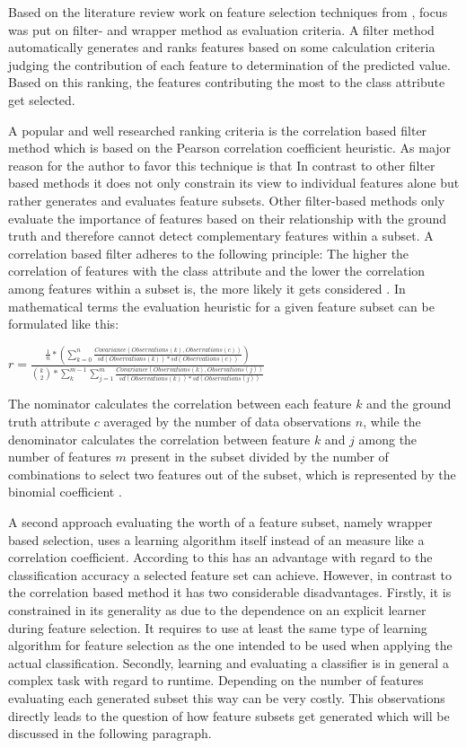 Based on the literature review work on feature selection techniques from \cite{chandrashekar2014survey}, focus was put on filter- and wrapper method as evaluation criteria. A filter method automatically generates and ranks features based on some calculation criteria judging the contribution of each feature to determination of the predicted value. Based on this ranking, the features contributing the most to the class attribute get selected.

A popular and well researched ranking criteria is the correlation based filter method which is based on the Pearson correlation coefficient heuristic. As major reason for the author to favor this technique is that In contrast to other filter based methods it does not only constrain its view to individual features alone but rather generates and evaluates feature subsets. Other filter-based methods only evaluate the importance of features based on their relationship with the ground truth and therefore cannot detect complementary features within a subset. A correlation based filter adheres to the following principle: The higher the correlation of features with the class attribute and the lower the correlation among features within a subset is, the more likely it gets considered \cite{hall2000correlation}. In mathematical terms the evaluation heuristic for a given feature subset can be formulated like this:

$r = \frac{\frac{1}{n} * (\displaystyle\sum_{k=0}^{n} \frac{Covariance(Observations(k), Observations(c))}{sd(Observations(k)) * sd(Observations(c))})}{\binom{k}{2} * \displaystyle\sum_{k}^{m - 1} \displaystyle\sum_{j = 1}^{m} \frac{Covariance(Observations(k), Observations(j))}{sd(Observations(k)) * sd(Observations(j))}}$

The nominator calculates the correlation between each feature $k$ and the ground truth attribute $c$ averaged by the number of data observations $n$, while the denominator calculates the correlation between feature $k$ and $j$ among the number of features $m$ present in the subset divided by the number of combinations to select two features out of the subset, which is represented by the binomial coefficient \cite{hall2000correlation}. 

A second approach evaluating the worth of a feature subset, namely wrapper based selection, uses a learning algorithm itself instead of an measure like a correlation coefficient. According to \cite{dash1997feature} this has an advantage with regard to the classification accuracy a selected feature set can achieve. However, in contrast to the correlation based method it has two considerable disadvantages. Firstly, it is constrained in its generality as due to the dependence on an explicit learner during feature selection. It requires to use at least the same type of learning algorithm for feature selection as the one intended to be used when applying the actual classification. Secondly, learning and evaluating a classifier is in general a complex task with regard to runtime. Depending on the number of features evaluating each generated subset this way can be very costly. This observations directly leads to the question of how feature subsets get generated which will be discussed in the following paragraph. 


